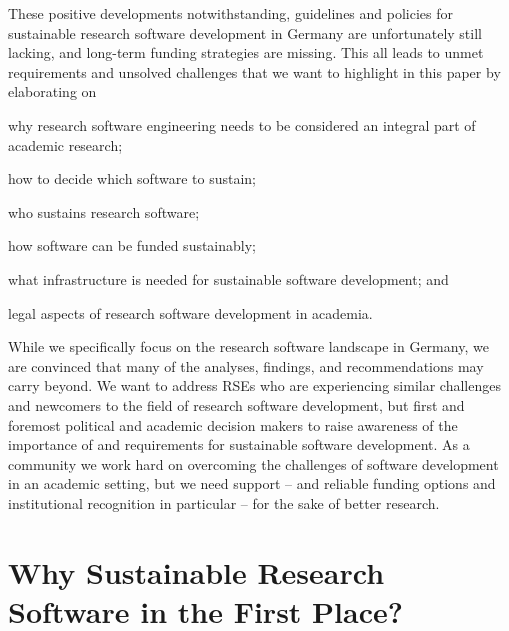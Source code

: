 \documentclass[a4paper,num-refs,numbers,sort&compress]{de-rse}
\begin{document}
These positive developments notwithstanding, guidelines and policies for sustainable research software
development in Germany are unfortunately still lacking, and long-term funding
strategies are missing. This all leads to unmet requirements and
unsolved challenges that we want to highlight in this paper by
elaborating on
\begin{inlinelist}
    \item why research software engineering needs to be considered an integral part of academic research;
    \item how to decide which software to sustain; 
    \item who sustains research software;
    \item how software can be funded sustainably;
    \item what infrastructure is needed for sustainable software development; and
    \item legal aspects of research software development in academia.
\end{inlinelist}
While we specifically focus on the research software landscape in
Germany, we are convinced that many of the analyses, findings, and
recommendations may carry beyond. We want to address RSEs who are
experiencing similar challenges and newcomers to the field of research
software development, but first and foremost political and academic decision makers to
raise awareness of the importance of and requirements for sustainable software
development. As a community we work hard on overcoming the challenges of
software development in an academic setting, but we need support -- and reliable funding options and institutional recognition in particular -- for
the sake of better research.

\section{Why Sustainable Research Software in the First Place?}
\label{sec:motivation}
\end{document}
